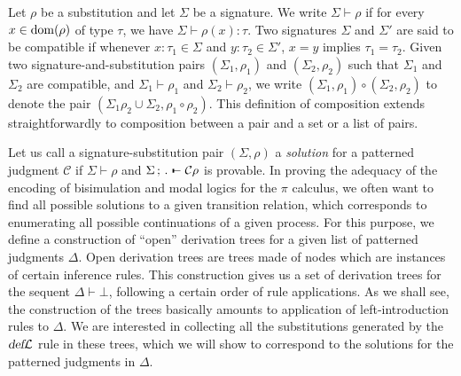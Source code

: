 \documentclass{acmtrans2m}
\def\Cscr{{\mathcal C}}
\def\relbar{\mathrel{\smash-}}
\def\joinrelm{\mathrel{\mkern-3.2mu}}
\def\tailpiece{\kern 1pt\vrule height 1ex width 0.3ex depth -.25ex}
\def\seqsym{\mathrel{\tailpiece\joinrelm\relbar}}
\newcommand{\NSeq}[3]{#1\,;\,#2 \seqsym #3}
\newcommand{\defL}{\hbox{\sl def}{\cal L}}
\newcommand{\dom}[1]{{\rm dom}(#1)}
\begin{document}
Let $\rho$ be a substitution and let $\Sigma$ be a signature.
We write $\Sigma \vdash \rho$ if for every $x \in \dom{\rho}$ of type $\tau$,
we have $\Sigma \vdash \rho(x): \tau.$ 
Two signatures $\Sigma$ and $\Sigma'$ are said to be compatible
if whenever $x : \tau_1 \in \Sigma$ and $y :\tau_2 \in \Sigma'$, 
$x = y$ implies $\tau_1 = \tau_2.$
Given two signature-and-substitution pairs 
$(\Sigma_1, \rho_1)$ and $(\Sigma_2, \rho_2)$ such that $\Sigma_1$ and $\Sigma_2$
are compatible, and $\Sigma_1 \vdash \rho_1$ and $\Sigma_2 \vdash \rho_2$, 
we write $(\Sigma_1, \rho_1) \circ (\Sigma_2, \rho_2)$ to denote the pair
$
(\Sigma_1\rho_2 \cup \Sigma_2, \rho_1 \circ \rho_2).
$ 
This definition of composition extends straightforwardly
to composition between a pair and a set or a list of pairs. 

Let us call a  signature-substitution pair $(\Sigma,\rho)$ a {\em solution}
for a patterned judgment $\Cscr$ if $\Sigma \vdash \rho$ and 
$\NSeq{\Sigma}{.}{\Cscr\rho}$ is provable. 
In proving the adequacy of the encoding of bisimulation and
modal logics for the $\pi$ calculus, we often want to find
all possible solutions to a given transition relation, which
corresponds to enumerating all possible continuations of
a given process. 
For this purpose, we define a construction of ``open'' derivation 
trees for a given list of patterned judgments $\Delta$. Open derivation trees 
are trees made of nodes which are instances of certain inference rules. 
This construction gives us a set of derivation trees for the 
sequent $\Delta \vdash \bot$, following a certain order of rule applications. 
As we shall see, the construction of the trees basically amounts to 
application of left-introduction rules to $\Delta$. We are interested 
in collecting all the substitutions generated by the $\defL$ rule
in these trees, which we will show to correspond 
to the solutions for the patterned judgments in $\Delta.$
\end{document}
